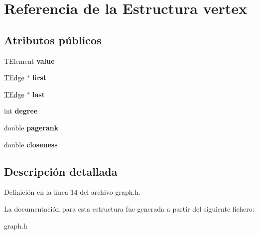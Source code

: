 \hypertarget{structvertex}{}\section{Referencia de la Estructura vertex}
\label{structvertex}
\subsection*{Atributos públicos}
\begin{DoxyCompactItemize}
\item 
\mbox{\label{structvertex_aa59401333a667557d142b99ac34e4974}} 
T\+Element {\bfseries value}
\item 
\mbox{\label{structvertex_a357eafd3ac8c7cc419146426bd6f1b6d}} 
\hyperlink{structedge}{T\+Edge} $\ast$ {\bfseries first}
\item 
\mbox{\label{structvertex_a83403cde52243ffd3c3eeddaad7c9707}} 
\hyperlink{structedge}{T\+Edge} $\ast$ {\bfseries last}
\item 
\mbox{\label{structvertex_a8c1d8cd0f824cca7027739803dbdb280}} 
int {\bfseries degree}
\item 
\mbox{\label{structvertex_a77f0695b1cbde31afaf5e3fc95b9fe03}} 
double {\bfseries pagerank}
\item 
\mbox{\label{structvertex_a650299a80cb4d454df9a85a68aeaa5d7}} 
double {\bfseries closeness}
\end{DoxyCompactItemize}


\subsection{Descripción detallada}


Definición en la línea 14 del archivo graph.\+h.



La documentación para esta estructura fue generada a partir del siguiente fichero\+:\begin{DoxyCompactItemize}
\item 
graph.\+h\end{DoxyCompactItemize}
